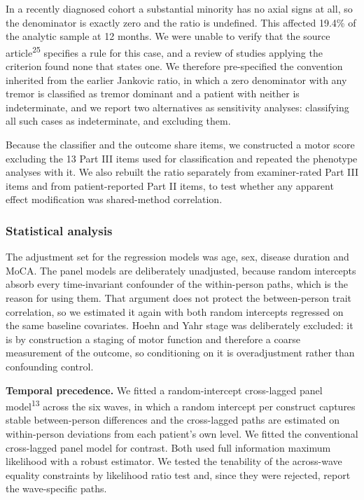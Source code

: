 \documentclass[
  english,
  12pt,
]{article}
\begin{document}
In a recently diagnosed cohort a substantial minority has no axial signs at all, so the denominator is exactly zero and the ratio is undefined. This affected 19.4\% of the analytic sample at 12 months. We were unable to verify that the source article\textsuperscript{25} specifies a rule for this case, and a review of studies applying the criterion found none that states one. We therefore pre-specified the convention inherited from the earlier Jankovic ratio, in which a zero denominator with any tremor is classified as tremor dominant and a patient with neither is indeterminate, and we report two alternatives as sensitivity analyses: classifying all such cases as indeterminate, and excluding them.

Because the classifier and the outcome share items, we constructed a motor score excluding the 13 Part III items used for classification and repeated the phenotype analyses with it. We also rebuilt the ratio separately from examiner-rated Part III items and from patient-reported Part II items, to test whether any apparent effect modification was shared-method correlation.

\subsubsection{Statistical analysis}\label{statistical-analysis}

The adjustment set for the regression models was age, sex, disease duration and MoCA. The panel models are deliberately unadjusted, because random intercepts absorb every time-invariant confounder of the within-person paths, which is the reason for using them. That argument does not protect the between-person trait correlation, so we estimated it again with both random intercepts regressed on the same baseline covariates. Hoehn and Yahr stage was deliberately excluded: it is by construction a staging of motor function and therefore a coarse measurement of the outcome, so conditioning on it is overadjustment rather than confounding control.

\textbf{Temporal precedence.} We fitted a random-intercept cross-lagged panel model\textsuperscript{13} across the six waves, in which a random intercept per construct captures stable between-person differences and the cross-lagged paths are estimated on within-person deviations from each patient's own level. We fitted the conventional cross-lagged panel model for contrast. Both used full information maximum likelihood with a robust estimator. We tested the tenability of the across-wave equality constraints by likelihood ratio test and, since they were rejected, report the wave-specific paths.
\end{document}
